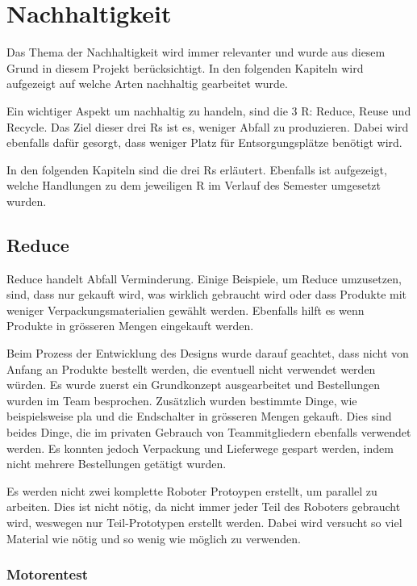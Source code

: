 \section{Nachhaltigkeit}
\label{section:Nachhaltigkeit}

Das Thema der Nachhaltigkeit wird immer relevanter und wurde aus diesem Grund in diesem Projekt berücksichtigt. In den folgenden Kapiteln wird aufgezeigt auf welche Arten nachhaltig gearbeitet wurde.

Ein wichtiger Aspekt um nachhaltig zu handeln, sind die 3 R: Reduce, Reuse und Recycle. Das Ziel dieser drei Rs ist es, weniger Abfall zu produzieren. Dabei wird ebenfalls dafür gesorgt, dass weniger Platz für Entsorgungsplätze benötigt wird.\cite{3-r}

In den folgenden Kapiteln sind die drei Rs erläutert. Ebenfalls ist aufgezeigt, welche Handlungen zu dem jeweiligen R im Verlauf des Semester umgesetzt wurden.

\subsection{Reduce}

Reduce handelt Abfall Verminderung. Einige Beispiele, um Reduce umzusetzen, sind, dass nur gekauft wird, was wirklich gebraucht wird oder dass Produkte mit weniger Verpackungsmaterialien gewählt werden. Ebenfalls hilft es wenn Produkte in grösseren Mengen eingekauft werden.

Beim Prozess der Entwicklung des Designs wurde darauf geachtet, dass nicht von Anfang an Produkte bestellt werden, die eventuell nicht verwendet werden würden. Es wurde zuerst ein Grundkonzept ausgearbeitet und Bestellungen wurden im Team besprochen. Zusätzlich wurden bestimmte Dinge, wie beispielsweise \acrshort{pla} und die Endschalter in grösseren Mengen gekauft. Dies sind beides Dinge, die im privaten Gebrauch von Teammitgliedern ebenfalls verwendet werden. Es konnten jedoch Verpackung und Lieferwege gespart werden, indem nicht mehrere Bestellungen getätigt wurden. 

Es werden nicht zwei komplette Roboter Protoypen erstellt, um parallel zu arbeiten. Dies ist nicht nötig, da nicht immer jeder Teil des Roboters gebraucht wird, weswegen nur Teil-Prototypen erstellt werden. Dabei wird versucht so viel Material wie nötig und so wenig wie möglich zu verwenden.

\subsubsection{Motorentest}

